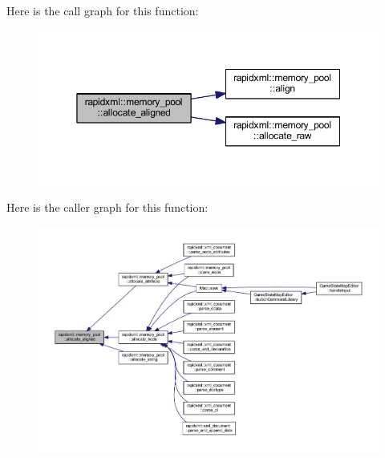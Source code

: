 Here is the call graph for this function\+:\nopagebreak
\begin{figure}[H]
\begin{center}
\leavevmode
\includegraphics[width=350pt]{classrapidxml_1_1memory__pool_a4e9cf53fa5f9da3a8f31b754bd94b4ec_cgraph}
\end{center}
\end{figure}




Here is the caller graph for this function\+:\nopagebreak
\begin{figure}[H]
\begin{center}
\leavevmode
\includegraphics[width=350pt]{classrapidxml_1_1memory__pool_a4e9cf53fa5f9da3a8f31b754bd94b4ec_icgraph}
\end{center}
\end{figure}


